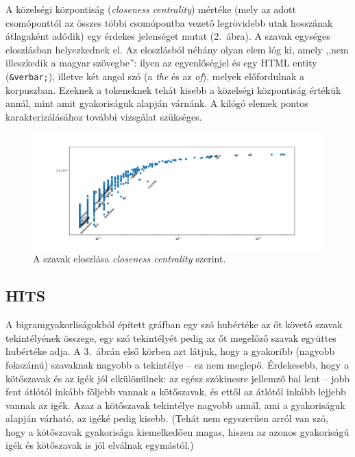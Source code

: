 \documentclass{llncs}
\newcommand{\embf}[1]{\textbf{#1}}
\newcommand{\liex}[1]{\emph{#1}}
\newcommand{\XXX}[1]{{\small \color{megjcolor} [XXX #1]}}
\begin{document}
A közelségi központiság (\emph{closeness centrality}) mértéke (mely
az adott csomóponttól az összes többi csomópontba vezető
legrövidebb utak hosszának átlagaként adódik)
egy érdekes jelenséget mutat
(2.~ábra).  %
%
A szavak egységes eloszlásban helyezkednek el.
Az eloszlásból néhány olyan elem lóg ki, amely
,,nem illeszkedik a magyar szövegbe'':
ilyen az egyenlőségjel és egy HTML entity ({\tt \&verbar;}),
illetve két angol szó (a \liex{the} és az \liex{of}),
melyek előfordulnak a korpuszban.
%
Ezeknek a tokeneknek tehát kisebb
a közelségi központiság értékük annál,
mint amit gyakoriságuk alapján várnánk.
%
A kilógó elemek pontos karakterizálásához további vizsgálat szükséges.
%

\begin{figure}
\begin{center}
\includegraphics[width=25cm]{current-flow-closeness.png}
\caption{A szavak eloszlása \emph{closeness centrality} szerint.}
\end{center}
\label{fig:closeness}
\end{figure}

\subsection{HITS}

A bigramgyakorliságokból épített gráfban egy szó hubértéke az őt követő szavak
tekintélyének összege, egy szó tekintélyét pedig az őt megelőző szavak együttes
hubértéke adja.
A 3.~ábrán első körben azt látjuk, hogy a gyakoribb (nagyobb fokszámú)
szavaknak nagyobb a tekintélye -- ez nem meglepő. Érdekesebb, hogy a kötőszavak
és az igék jól elkülönülnek:
az egész szókincsre jellemző bal lent -- jobb fent átlótól inkább följebb vannak a kötőszavak,
és ettől az átlótól inkább lejjebb vannak az igék.
Azaz a kötőszavak tekintélye nagyobb annál, ami a gyakoriságuk alapján várható,
az igéké pedig kisebb.
%
(Tehát nem egyszerűen arról van szó,
hogy a kötőszavak gyakorisága kiemelkedően magas,
hiszen az azonos gyakoriságú igék és kötőszavak is jól elválnak egymástól.)
\end{document}
